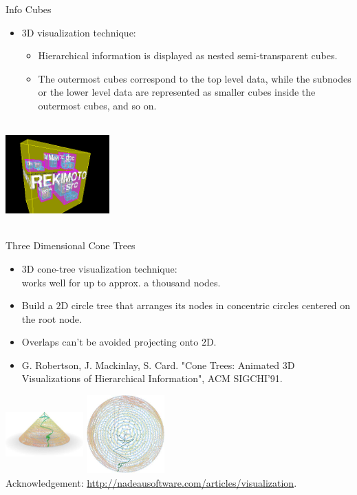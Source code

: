 \begin{frame}{Info Cubes}
  \begin{itemize}
  \item $3$D visualization technique:
    \begin{itemize}
    \item Hierarchical information is displayed as nested semi-transparent cubes.
    \item The outermost cubes correspond to the top level data, while the subnodes or the lower level data are represented as smaller cubes inside the outermost cubes, and so on.
    \end{itemize}
  \end{itemize}
  \vspace{0.2cm}
  \centering
  \includegraphics[width=4cm,height=4cm]{img/infocube.png}
\end{frame}

\begin{frame}{Three Dimensional Cone Trees}
  \centering
  \begin{itemize}
  \item $3$D cone-tree visualization technique:\\
    works well for up to approx. a thousand nodes.
  \item Build a $2$D circle tree that arranges its nodes in concentric circles centered on the root node.
  \item Overlaps can't be avoided projecting onto $2$D.
  \item G. Robertson, J. Mackinlay, S. Card. "Cone Trees: Animated 3D Visualizations of Hierarchical Information", ACM SIGCHI'91.
  \end{itemize}
  \vspace{0.2cm}
  \includegraphics[width=3cm,height=3cm]{img/threedcone_one.jpg}\hspace{1cm}
  \includegraphics[width=3cm,height=3cm]{img/threedcone_two.jpg}\\
  \tiny{Acknowledgement: \href{ttp://nadeausoftware.com/articles/visualization}{http://nadeausoftware.com/articles/visualization}.}
\end{frame}

